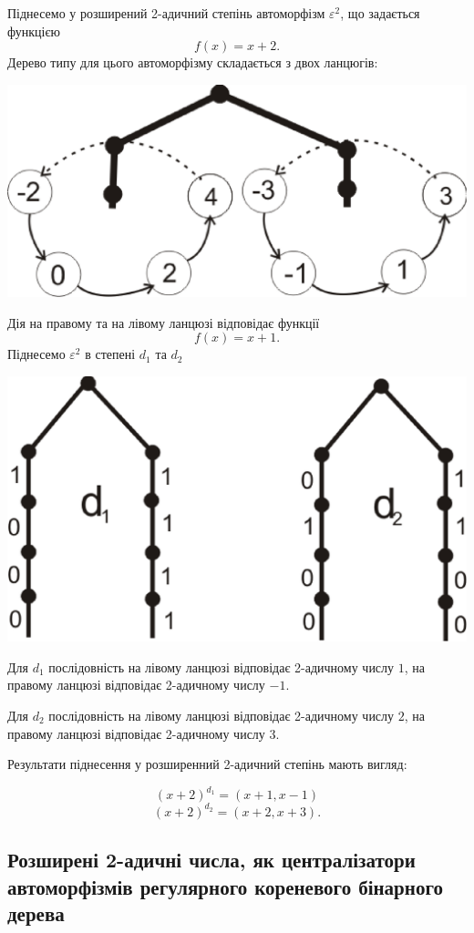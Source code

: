 \documentclass[a4paper,12pt]{article} \usepackage{a4wide}
\numberwithin{equation}{subsection}
\begin{document}
  Піднесемо у розширений 2-адичний степінь автоморфізм $\varepsilon^2$, що задається функцією $$f(x)=x+2.$$
  Дерево типу для цього автоморфізму складається з двох ланцюгів:
  \begin{center}
\includegraphics[scale=0.6]{Gr(x+2).eps}
\end{center}
Дія на правому та на лівому ланцюзі відповідає функції $$f(x)=x+1.$$
Піднесемо $\varepsilon^2$ в степені $d_1$ та $d_2$
\begin{center}
\includegraphics[scale=0.6]{d1d2.eps}
\end{center}
  Для $d_1$ послідовність на лівому ланцюзі відповідає 2-адичному числу $1$, на правому ланцюзі відповідає 2-адичному числу $-1$.

 Для $d_2$ послідовність на лівому ланцюзі відповідає 2-адичному числу $2$, на правому ланцюзі відповідає 2-адичному числу $3$.

 Результати піднесення у розширенний 2-адичний степінь мають вигляд:


$$(x+2)^{d_1}=(x+1,x-1)$$
$$(x+2)^{d_2}=(x+2,x+3).$$



\subsection{Розширені 2-адичні числа, як централізатори автоморфізмів регулярного кореневого бінарного дерева}
\end{document}
